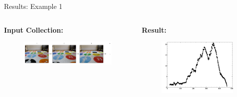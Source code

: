 \documentclass[10pt, compress]{beamer}
\begin{document}
\begin{frame}{Results: Example 1}

\begin{columns}[T] %
\begin{column}{.48\textwidth}

\textbf{Input Collection:}

\begin{figure}[ht!]
\centering
\vspace{0.3cm}
\includegraphics[scale=0.18]{calibimages_good.png}
\end{figure}

\end{column}%
\hfill%
\begin{column}{.48\textwidth}

\textbf{Result:}

\begin{figure}[ht!]
\centering
\includegraphics[scale=0.22]{flat_10cm_results.png}
\end{figure}

\end{column}%
\end{columns}

\end{frame}
\end{document}
